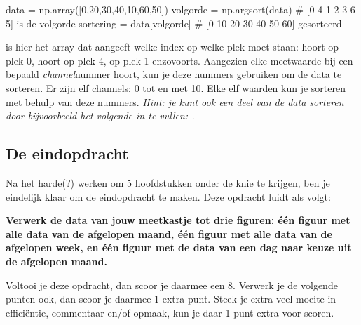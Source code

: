 \documentclass[a4paper,11pt, fleqn]{article}
\begin{document}
\begin{python}
data = np.array([0,20,30,40,10,60,50])
volgorde = np.argsort(data)		# [0 4 1 2 3 6 5] is de volgorde
sortering = data[volgorde]		# [0 10 20 30 40 50 60] gesorteerd
\end{python}

 is hier het array dat aangeeft welke index op welke plek moet staan:  hoort op plek 0,  hoort op plek 4,  op plek 1 enzovoorts. Aangezien elke meetwaarde bij een bepaald {\it channel}nummer hoort, kun je deze nummers gebruiken om de data te sorteren. Er zijn elf channels: 0 tot en met 10. Elke elf waarden kun je sorteren met behulp van deze nummers. {\it Hint: je kunt ook een deel van de data sorteren door bijvoorbeeld het volgende in te vullen: .}

\subsection{De eindopdracht}
Na het harde(?) werken om 5 hoofdstukken onder de knie te krijgen, ben je eindelijk klaar om de eindopdracht te maken. Deze opdracht luidt als volgt: 

{\bf Verwerk de data van jouw meetkastje tot drie figuren: \'e\'en figuur met alle data van de afgelopen maand, \'e\'en figuur met alle data van de afgelopen week, en \'e\'en figuur met de data van een dag naar keuze uit de afgelopen maand.}

Voltooi je deze opdracht, dan scoor je daarmee een 8. Verwerk je de volgende punten ook, dan scoor je daarmee 1 extra punt. Steek je extra veel moeite in effici\"entie, commentaar en/of opmaak, kun je daar 1 punt extra voor scoren.
\end{document}
